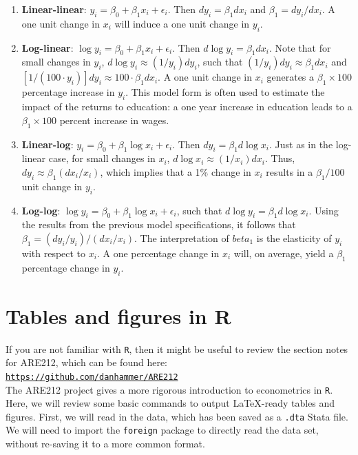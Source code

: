 \documentclass{article}
\begin{document}
\begin{enumerate}
\item \textbf{Linear-linear}: $y_i = \beta_0 + \beta_1 x_i + \epsilon_i$.  Then $d y_i =
   \beta_1 d x_i$ and $\beta_1 = d y_i / d x_i$.  A one unit change in
   $x_i$ will induce a one unit change in $y_i$.
\item \textbf{Log-linear}: $\log y_i = \beta_0 + \beta_1 x_i + \epsilon_i$. Then
   $d \log y_i = \beta_1 d x_i$.  Note that for small changes in
   $y_i$, $d \log y_i \approx (1/ y_i) d y_i$, such that $(1/ y_i) d
   y_i \approx \beta_1 d x_i$ and $[1/ (100 \cdot y_i)] d y_i \approx
   100 \cdot \beta_1 d x_i$.  A one unit change in $x_i$ generates a
   $\beta_1 \times 100$ percentage increase in $y_i$.  This model form
   is often used to estimate the impact of the returns to education: a
   one year increase in education leads to a $\beta_1 \times 100$ percent
   increase in wages.
\item \textbf{Linear-log}: $y_i = \beta_0 + \beta_1 \log x_i + \epsilon_i$. Then
   $d y_i = \beta_1 d \log x_i$.  Just as in the log-linear case, for
   small changes in $x_i$, $d \log x_i \approx (1/ x_i) d x_i$.  Thus,
   $d y_i \approx \beta_1 (d x_i / x_i)$, which implies that a 1\%
   change in $x_i$ results in a $\beta_1 / 100$ unit change in $y_i$.
\item \textbf{Log-log}: $\log y_i = \beta_0 + \beta_1 \log x_i + \epsilon_i$,
   such that $d \log y_i = \beta_1 d \log x_i$.  Using the results
   from the previous model specifications, it follows that $\beta_1 =
   (d y_i / y_i)/(d x_i / x_i)$.  The interpretation of $beta_1$ is
   the elasticity of $y_i$ with respect to $x_i$.  A one percentage
   change in $x_i$ will, on average, yield a $\beta_1$ percentage
   change in $y_i$.
\end{enumerate}
\section*{Tables and figures in R}
\label{sec-2}


If you are not familiar with \texttt{R}, then it might be useful to review
the section notes for ARE212, which can be found here: \\

\href{https://github.com/danhammer/ARE212}{\texttt{https://github.com/danhammer/ARE212}} \\

The ARE212 project gives a more rigorous introduction to econometrics
in \texttt{R}.  Here, we will review some basic commands to output
\LaTeX-ready tables and figures.  First, we will read in the data,
which has been saved as a \texttt{.dta} Stata file.  We will need to import
the \texttt{foreign} package to directly read the data set, without re-saving
it to a more common format.
\end{document}
